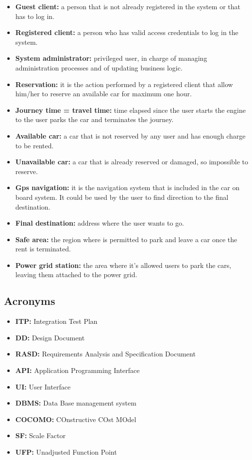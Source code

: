 \begin{itemize}
\item \textbf{Guest client:} a person that is not already registered in the system or that has to log in.
\item \textbf{Registered client:} a person who has valid access credentials to log in the system.
\item \textbf{System administrator:} privileged user, in charge of managing administration processes and of updating business logic.
\item \textbf{Reservation:} it is the action performed by a registered client that allow him/her to reserve an available car for maximum one hour.
\item \textbf{Journey time = travel time:} time elapsed since the user starts the engine to the user parks the car and terminates the journey.
\item \textbf{Available car:} a car that is not reserved by any user and has enough charge to be rented.
\item \textbf{Unavailable car:} a car that is already reserved or damaged, so impossible to reserve.
\item \textbf{Gps navigation:} it is the navigation system that is included in the car on board system. It could be used by the user to find direction to the final destination.
\item \textbf{Final destination:} address where the user wants to go.
\item \textbf{Safe area:} the region where is permitted to park and leave a car once the rent is terminated.
\item \textbf{Power grid station:} the area where it’s allowed users to park the cars, leaving them attached to the power grid.
\end{itemize}

\subsection{Acronyms}

\begin{itemize}
\item \textbf{ITP:} Integration Test Plan
\item \textbf{DD:} Design Document
\item \textbf{RASD:} Requirements Analysis and Specification Document
\item \textbf{API:} Application Programming Interface
\item \textbf{UI:} User Interface
\item \textbf{DBMS:} Data Base management system
\item \textbf{COCOMO:} COnstructive COst MOdel
\item \textbf{SF:} Scale Factor
\item \textbf{UFP:} Unadjusted Function Point
\end{itemize}

